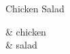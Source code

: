
\begin{recipe}{Chicken Salad}%
  \time{}
  \yield{}
  \servings{}
  \maketitle

  \begin{ingredients2}
    \mbox{} & chicken\\
    & salad
  \end{ingredients2}
\end{recipe}

